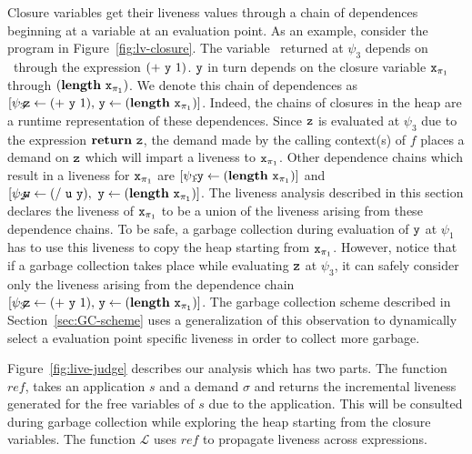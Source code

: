 \documentclass[9pt]{sigplanconf}
\begin{document}
 
Closure  variables get  their  liveness values  through  a chain  of
dependences beginning at  a variable at an evaluation  point.  As an
example, consider the program in Figure~\ref{fig:lv-closure}.
The variable  \pz\ returned  at $\psi_3$ depends  on \py\  through the
expression $(+~\mbox{\tt y}~1)$.  $\mbox{\tt y}$ in turn depends on the closure variable
$\mbox{\tt x}_{\mathit{\pi}_1}$  through $(\mathbf{length}~\mbox{\tt x}_{\mathit{\pi}_1})$.   We
denote this  chain of  dependences as  $\lbrack \psi_3\!\!\!:\!\!\!\mbox{\tt z}
\leftarrow            (+~\mbox{\tt y}~1),\,           \mbox{\tt y}            \leftarrow
(\mathbf{length}~\mbox{\tt x}_{\mathit{\pi}_1})\rbrack$.  Indeed,  the chains of closures  in the
heap are a  runtime representation of these  dependences.  Since $\mbox{\tt z}$
is evaluated  at $\psi_3$  due to  the expression  $\mbox{$\mathbf{ return}$}~\mbox{\tt z}$, the
demand made by the calling context(s)  of $f$ places a demand on $\mbox{\tt z}$
which  will  impart a  liveness  to  $\mbox{\tt x}_{\pi_1}$.  Other  dependence
chains  which result  in  a liveness  for  $\mbox{\tt x}_{\pi_1}$ are  $\lbrack
\psi_1\!\!\!:\!\!\mbox{\tt y}   \leftarrow  (\mathbf{length}~\mbox{\tt x}_{\pi_1})\rbrack$   and
$\lbrack   \psi_2\!\!\!:\!\!\!\mbox{\tt w}   \leftarrow  (/~\mbox{\tt u}~\mbox{\tt y}),\,\,   \mbox{\tt y}
\leftarrow   (\mathbf{length}~\mbox{\tt x}_{\pi_1})\rbrack$.   The   liveness  analysis
described in this section declares the liveness of $\mbox{\tt x}_{\pi_1}$ to be
a union of  the liveness arising from these dependence  chains.  To be
safe, a garbage collection during  evaluation of $\mbox{\tt y}$ at $\psi_1$ has
to use  this liveness to  copy the heap starting from  $\mbox{\tt x}_{\pi_1}$.  However,
notice that if a garbage collection takes place while evaluating $\mbox{\tt z}$
at $\psi_3$, it can safely consider only the liveness arising from the
dependence chain\linebreak  $\lbrack \psi_3\!\!\!:\!\!\!\mbox{\tt z} \leftarrow
(+~\mbox{\tt y}~1),\, \mbox{\tt y} \leftarrow (\mathbf{length}~\mbox{\tt x}_{\pi_1})\rbrack$.  The garbage
collection  scheme  described  in Section~\ref{sec:GC-scheme}  uses  a
generalization of this observation  to dynamically select a evaluation
point specific liveness in order to collect more garbage.



Figure~\ref{fig:live-judge}  describes  our  analysis  which  has  two
parts. The  function $\mathit{ref}$,  takes an  application $s$  and a
demand $\sigma$ and returns the incremental liveness generated for the
free variables of $s$ due to  the application.  This will be consulted
during garbage collection  while exploring the heap  starting from the
closure  variables.  The function $\mathcal{L}$  uses  $\mathit{ref}$ to  propagate
liveness across expressions.
\end{document}
